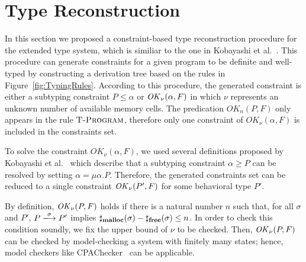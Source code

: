 \section{Type Reconstruction}\label{sec:reconstruction}
In this section we proposed a constraint-based type reconstruction
procedure for the extended type system, which is similiar to the one
in Kobayashi et al.~\cite{DBLP:journals/lmcs/KobayashiSW06}.  This
procedure can generate constraints for a given program to be definite
and well-typed by constructing a derivation tree based on the rules in
Figure~\ref{fig:TypingRules}. According to this procedure, the
generated constraint is either a subtyping constraint \(P \le \alpha
\) or \(\mathit{OK}_\nu(\alpha, F)\) in which \(\nu\) represents an unknown
number of available memory cells. The predication \(OK_n(P, F)\) only
appears in the rule \(\textsc{{T-Program}}\), therefore only one constraint of
\(OK_\nu(\alpha, F)\) is included in the constraints set.

To solve the constraint \(OK_\nu(\alpha, F)\), we used several
definitions proposed by Kobayashi et al.~\cite[Lemma
  3.8]{DBLP:journals/lmcs/KobayashiSW06} which describe that a
subtyping constraint \(\alpha \ge P\) can be resolved by setting
\(\alpha = \mu \alpha. P\).  Therefore, the generated constraints set
can be reduced to a single constraint \(\mathit{OK}_{\nu}(P', F)\) for some
behavioral type \(P'\).

By definition, \(\mathit{OK}_{\nu}(P, F)\) holds if there is a natural number
\(n\) such that, for all \(\sigma\) and \(P'\), \(P
\xlongrightarrow{\sigma} P'\) implies \(\sharp_{\mathbf{malloc}}(\sigma) -
\sharp_{\mathbf{free}}(\sigma) \le n\).  In order to check this condition
soundly, we fix the upper bound of \(\nu\) to be checked.  Then,
\(\mathit{OK}_{\nu}(P, F)\) can be checked by model-checking a system with
finitely many states; hence, model checkers like
CPAChecker~\cite{beyer2011cpachecker} can be applicable.
